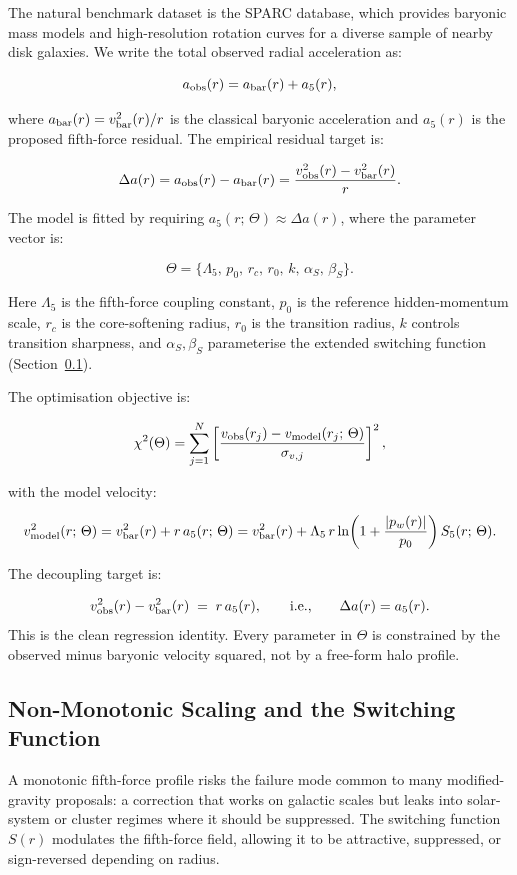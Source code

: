 \documentclass[11pt,a4paper]{article}
\newcommand{\pw}{p_w}                        %
\newcommand{\Lf}{\Lambda_5}                  %
\newcommand{\afiver}{a_5}                    %
\newcommand{\Sfive}{S_5}                     %
\newcommand{\vobs}{v_{\rm obs}}              %
\newcommand{\vbar}{v_{\rm bar}}              %
\newcommand{\vmod}{v_{\rm model}}            %
\newcommand{\aobs}{a_{\rm obs}}              %
\newcommand{\abar}{a_{\rm bar}}              %
\begin{document}
The natural benchmark dataset is the SPARC database, which provides baryonic
mass models and high-resolution rotation curves for a diverse sample of nearby
disk galaxies.  We write the total observed radial acceleration as:

\[
  \aobs(r) = \abar(r) + \afiver(r) ,
\]

where $\abar(r) = \vbar^2(r)/r$ is the classical baryonic acceleration and
$\afiver(r)$ is the proposed fifth-force residual.  The empirical residual
target is:

\[
  \Delta a(r) = \aobs(r) - \abar(r)
  = \frac{\vobs^2(r) - \vbar^2(r)}{r} .
\]

The model is fitted by requiring $\afiver(r;\,\Theta) \approx \Delta a(r)$,
where the parameter vector is:

\[
  \Theta = \{\Lf,\,p_0,\,r_c,\,r_0,\,k,\,\alpha_S,\,\beta_S\} .
\]

Here $\Lf$ is the fifth-force coupling constant, $p_0$ is the reference
hidden-momentum scale, $r_c$ is the core-softening radius, $r_0$ is the
transition radius, $k$ controls transition sharpness, and $\alpha_S,\beta_S$
parameterise the extended switching function (Section~\ref{sec:switching}).

The optimisation objective is:

\[
  \chi^2(\Theta) = \sum_{j=1}^{N}
  \left[\frac{\vobs(r_j) - \vmod(r_j;\,\Theta)}{\sigma_{v,j}}\right]^2 ,
\]

with the model velocity:

\[
  \vmod^2(r;\,\Theta)
  = \vbar^2(r) + r\,\afiver(r;\,\Theta)
  = \vbar^2(r) + \Lf\,r\ln\!\left(1+\frac{|\pw(r)|}{p_0}\right)
    \Sfive(r;\,\Theta) .
\]

The decoupling target is:

\begin{keybox}
\[
  \vobs^2(r) - \vbar^2(r) \;=\; r\,\afiver(r) ,
  \qquad \text{i.e.,} \qquad
  \Delta a(r) = \afiver(r) .
\]
This is the clean regression identity.  Every parameter in $\Theta$ is
constrained by the observed minus baryonic velocity squared, not by a
free-form halo profile.
\end{keybox}

\subsection{Non-Monotonic Scaling and the Switching Function}\label{sec:switching}

A monotonic fifth-force profile risks the failure mode common to many
modified-gravity proposals: a correction that works on galactic scales but
leaks into solar-system or cluster regimes where it should be suppressed.
The switching function $S(r)$ modulates the fifth-force field, allowing it
to be attractive, suppressed, or sign-reversed depending on radius.
\end{document}
